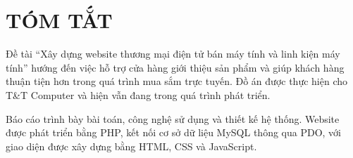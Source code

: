 \chapter*{TÓM TẮT}
\vspace{-40pt}

Đề tài ``Xây dựng website thương mại điện tử bán máy tính và linh kiện máy tính'' hướng đến việc hỗ trợ cửa hàng giới thiệu sản phẩm và giúp khách hàng thuận tiện hơn trong quá trình mua sắm trực tuyến. Đồ án được thực hiện cho T\&T Computer và hiện vẫn đang trong quá trình phát triển.

Báo cáo trình bày bài toán, công nghệ sử dụng và thiết kế hệ thống. Website được phát triển bằng PHP, kết nối cơ sở dữ liệu MySQL thông qua PDO, với giao diện được xây dựng bằng HTML, CSS và JavaScript.

